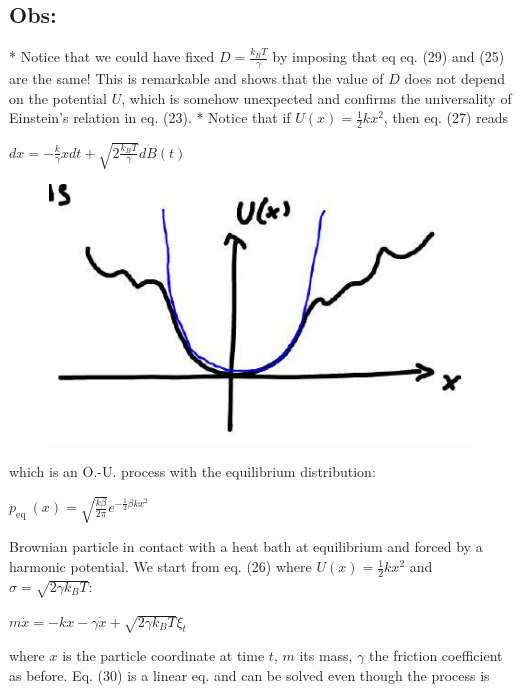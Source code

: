 \subsection*{Obs:}
    * Notice that we could have fixed $D=\frac{k_{B} T}{\gamma}$ by imposing that
eq eq. (29) and (25) are the same! This is remarkable and shows that the value of
$D$ does not depend on the potential $U$, which is somehow unexpected and
confirms the universality of Einstein's relation in eq. (23).
    * Notice that if $U(x)=\frac{1}{2} k x^{2}$, then eq. (27) reads
\begin{DispWithArrows}[displaystyle, format=c]
  $d x=-\frac{k}{\gamma} x d t+\sqrt{2 \frac{k_{B} T}{\gamma}} d B(t)$
\end{DispWithArrows}
\begin{figure}[H]
  \centering
  \includegraphics[width=\textwidth]{graphics/2025_10_17_15d569b79a40ed74679eg-15}
\end{figure}
which is an O.-U. process with the equilibrium distribution:
\begin{DispWithArrows}[displaystyle, format=c]
  $p_{\text {eq }}(x)=\sqrt{\frac{k \beta}{2 \pi}} e^{-\frac{1}{2} \beta k x^{2}}$
\end{DispWithArrows}
Brownian particle in contact with a heat bath at equilibrium and forced by a
harmonic potential. We start from eq. (26) where $U(x)=\frac{1}{2} k x^{2}$
and $\sigma=\sqrt{2 \gamma k_{B} T}$:
\begin{DispWithArrows}[displaystyle, format=c]
  $m \ddot{x}=-k x-\gamma \dot{x}+\sqrt{2 \gamma k_{B} T} \xi_{t}$
\end{DispWithArrows}
where $x$ is the particle coordinate at time $t$, $m$ its mass, $\gamma$ the
friction coefficient as before.
Eq. (30) is a linear eq. and can be solved even though the process is
